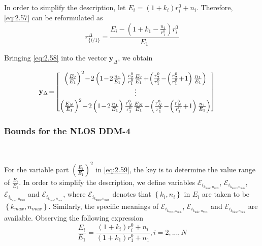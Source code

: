 \documentclass[journal]{IEEEtran}
\begin{document}
In order to simplify the description, let ${E_i} = \left(1+{k_i}\right){{r}_{i}^{0}} + {n_i}$. Therefore, \eqref{eq:2.57} can be reformulated as
 \begin{equation}\label{eq:2.58}
 {{r}_{\{i/1\}}^{\Delta}} = \frac{{E_i}-\left(1+{k_1}-\frac{n_1}{{r}_{1}^{0}}\right){{r}_{i}^{0}}}{E_1}
 \end{equation}

Bringing \eqref{eq:2.58} into the vector $\mathbf{y}_{\Delta}$, we obtain
 \begin{small}
 \begin{equation}\label{eq:2.59}
   \hspace{-4.5mm}
   \mathbf{y}_\Delta\!=\!
   \begin{bmatrix}
   \left(\frac{E_2}{E_1}\right)^2\!-\!2 \left(1\!-\!2 \frac{n_1}{E_1}\right)\frac{{r}_{2}^{0}}{{r}_{1}^{0}}\frac{E_2}{E_1}\!+\!\left(\frac{{r}_{2}^{0}}{{r}_{1}^{0}}\!-\!\left(\frac{{r}_{2}^{0}}{{r}_{1}^{0}}\!+\!1\right)\frac{n_1}{E_1}\right)\\
   \vdots \\
   \left(\frac{E_N}{E_1}\right)^2\!-\!2\left(1\!-\!2\frac{n_1}{E_1}\right)\frac{{r}_{N}^{0}}{{r}_{1}^{0}}\frac{E_N}{E_1}\!+\!\left(\frac{{r}_{N}^{0}}{{r}_{1}^{0}}\!-\!\left(\frac{{r}_{N}^{0}}{{r}_{1}^{0}}\!+\!1\right)\frac{n_1}{E_1}\right)
   \end{bmatrix}
   \end{equation}
\end{small}
 \subsubsection{Bounds for the NLOS DDM-4}
\

For the variable part $\left({\frac{E_i}{E_1}}\right)^2$ in \eqref{eq:2.59}, the key is to determine the value range of ${\frac{E_i}{E_1}}$. In order to simplify the description, we define variables $\mathcal{E}_{i_{{k_{\max}},{n_{\max}}}}$, $\mathcal{E}_{i_{{k_{\max}},{n_{\min}}}}$, $\mathcal{E}_{i_{{k_{\min}},{n_{\max}}}}$ and $\mathcal{E}_{i_{{k_{\min}},{n_{\min}}}}$, where $\mathcal{E}_{i_{{k_{\max}},{n_{\max}}}}$ denotes that $\left\{{k_i}, {n_i}\right\}$ in ${E_i}$ are taken to be $\left\{{k_{max}}, {n_{max}}\right\}$. Similarly, the specific meanings of $\mathcal{E}_{i_{{k_{\max}},{n_{\min}}}}$, $\mathcal{E}_{i_{{k_{\min}},{n_{\max}}}}$ and $\mathcal{E}_{i_{{k_{\min}},{n_{\min}}}}$ are available. Observing the following expression
\begin{equation}\label{eq:2.60}
\frac{E_i}{E_1} = \frac{(1+{k_i}){{r}_{i}^{0}}+{n_i}}{(1+{k_1}){{r}_{1}^{0}}+{n_1}},i=2,...,N
\end{equation}
\end{document}
